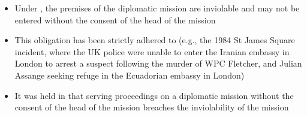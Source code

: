\begin{itemize}
    \item Under , the premises of the diplomatic mission are inviolable and may not be entered without the consent of the head of the mission
    \item This obligation has been strictly adhered to (e.g., the 1984 St James Square incident, where the UK police were unable to enter the Iranian embassy in London to arrest a suspect following the murder of WPC Fletcher, and Julian Assange seeking refuge in the Ecuadorian embassy in London)
    \item It was held in  that serving proceedings on a diplomatic mission without the consent of the head of the mission breaches the inviolability of the mission
\end{itemize}

